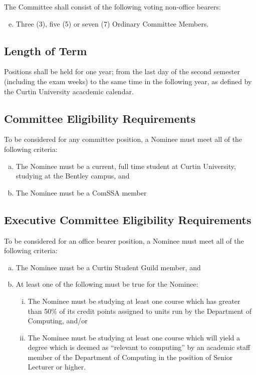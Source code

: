 \documentclass[a4paper,12pt]{article}
\begin{document}
The Committee shall consist of the following voting non-office bearers:

\begin{enumerate}[a)]
	\setcounter{enumi}{4}
	\item Three (3), five (5) or seven (7) Ordinary Committee Members.
\end{enumerate}

\subsection{Length of Term}

Positions shall be held for one year; from the last day of the second semester (including the exam weeks) to the same time in the following year, as defined by the Curtin University acacdemic calendar.

\subsection{Committee Eligibility Requirements}
\label{committee_eligibility}

To be considered for any committee position, a Nominee must meet all of the following criteria:

\begin{enumerate}[a)]
	\item The Nominee must be a current, full time student at Curtin University, studying at the Bentley campus, and
	\item The Nominee must be a ComSSA member
\end{enumerate}

\subsection{Executive Committee Eligibility Requirements}
\label{exec_committee_eligibility}

To be considered for an office bearer position, a Nominee must meet all of the following criteria:

\begin{enumerate}[a)]
	\item The Nominee must be a Curtin Student Guild member, and
	\item At least one of the following must be true for the Nominee:
	\begin{enumerate}[i)]
		\item The Nominee must be studying at least one course which has greater than 50\% of its credit points assigned to units run by the Department of Computing, and/or
		\item The Nominee must be studying at least one course which will yield a degree which is deemed as ``relevant to computing'' by an academic staff member of the Department of Computing in the position of Senior Lecturer or higher.
	\end{enumerate}
\end{enumerate}
\end{document}
